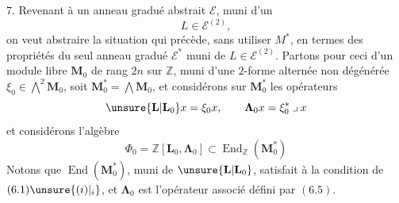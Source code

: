 7. Revenant à un anneau gradué abstrait $\mathcal E$, muni d'un
\[
L\in\mathcal E^{(2)},
\]
on veut abstraire la situation qui précède, sans utiliser $M^*$, en termes des propriétés du seul anneau  gradué $\mathcal E^*$ muni de $L\in\mathcal E^{(2)}$.
Partons pour ceci  d'un module libre $\mathbf M_0$ de rang $2n$ sur $\mathbb Z$, muni d'une $2$-forme alternée non dégénérée  $\xi_0\in\bigwedge^2\mathbf M_0$,  soit \deleted{$\unsure{\xi}$} $\mathbf M_0^*=\bigwedge\mathbf M_0$, et considérons sur $\mathbf M_0^*$ les opérateurs
\[
\unsure{\mathbf L|\mathbf L_0}x=\xi_0x,\qquad\boldsymbol\Lambda_0x=\xi_0^*\mathbin{\lrcorner}x
\]
et considérons l'algèbre
\[
\Phi_0=\mathbb Z[\mathbf L_0,\boldsymbol\Lambda_0]\subset\operatorname{End}_{\mathbb Z}(\mathbf M_0^*)
\]
Notons que $\operatorname{End}(\mathbf M_0^*)$,  muni de $\unsure{\mathbf L|\mathbf L_0}$, satisfait à la condition de $(6.1)\unsure{(i)|_i}$,  et \deleted{$\unsure{\xi}$} $\boldsymbol\Lambda_0$ est l'opérateur associé défini par $(6.5)$.
